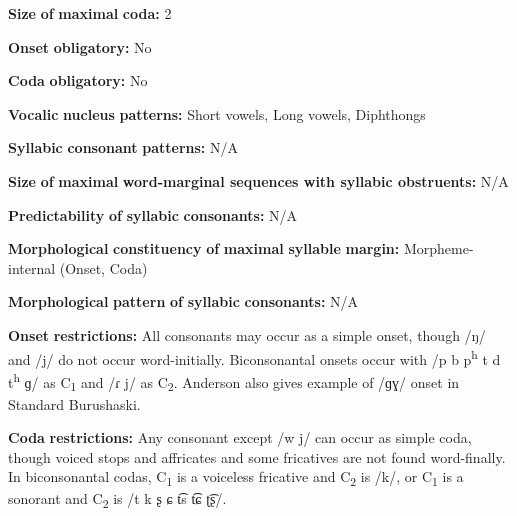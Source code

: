\begin{styleBody}
\textbf{Size} \textbf{of} \textbf{maximal} \textbf{coda:} 2
\end{styleBody}

\begin{styleBody}
\textbf{Onset} \textbf{obligatory:} No
\end{styleBody}

\begin{styleBody}
\textbf{Coda} \textbf{obligatory:} No
\end{styleBody}

\begin{styleBody}
\textbf{Vocalic} \textbf{nucleus} \textbf{patterns:} Short vowels, Long vowels, Diphthongs
\end{styleBody}

\begin{styleBody}
\textbf{Syllabic} \textbf{consonant} \textbf{patterns:} N/A
\end{styleBody}

\begin{styleBody}
\textbf{Size} \textbf{of} \textbf{maximal} \textbf{word{}-marginal sequences with syllabic obstruents:} N/A
\end{styleBody}

\begin{styleBody}
\textbf{Predictability} \textbf{of} \textbf{syllabic} \textbf{consonants:} N/A
\end{styleBody}

\begin{styleBody}
\textbf{Morphological} \textbf{constituency} \textbf{of} \textbf{maximal} \textbf{syllable} \textbf{margin:} Morpheme-internal (Onset, Coda)
\end{styleBody}

\begin{styleBody}
\textbf{Morphological} \textbf{pattern} \textbf{of} \textbf{syllabic} \textbf{consonants:} N/A
\end{styleBody}

\begin{styleBody}
\textbf{Onset} \textbf{restrictions:} All consonants may occur as a simple onset, though /ŋ/ and /j/ do not occur word-initially. Biconsonantal onsets occur with /p b p\textsuperscript{h} t d t\textsuperscript{h} ɡ/ as C\textsubscript{1} and /ɾ j/ as C\textsubscript{2}. Anderson also gives example of /ɡɣ/ onset in Standard Burushaski.
\end{styleBody}

\begin{styleBody}
\textbf{Coda} \textbf{restrictions:} Any consonant except /w j/ can occur as simple coda, though voiced stops and affricates and some fricatives are not found word-finally. In biconsonantal codas, C\textsubscript{1} is a voiceless fricative and C\textsubscript{2} is /k/, or C\textsubscript{1} is a sonorant and C\textsubscript{2} is /t k ʂ ɕ t͡s t͡ɕ ʈ͡ʂ/. 
\end{styleBody}


